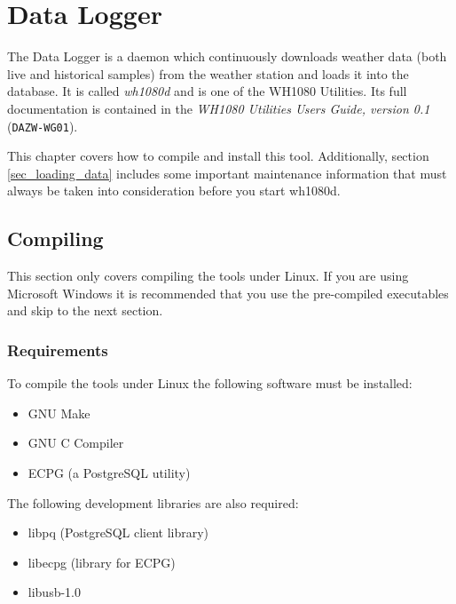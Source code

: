 \documentclass[a4paper,10pt,draft]{book}
\begin{document}

\chapter{Data Logger}
\label{cha_data_logger}

The Data Logger is a daemon which continuously downloads weather data (both live and historical samples) from the weather station and loads it into the database. It is called \emph{wh1080d} and is one of the WH1080 Utilities. Its full documentation is contained in the \emph{WH1080 Utilities Users Guide, version 0.1} (\verb|DAZW-WG01|).

This chapter covers how to compile and install this tool. Additionally, section \ref{sec_loading_data} includes some important maintenance information that must always be taken into consideration before you start wh1080d.

\section{Compiling}
This section only covers compiling the tools under Linux. If you are using Microsoft Windows it is recommended that you use the pre-compiled executables and skip to the next section.

\subsection{Requirements}
To compile the tools under Linux the following software must be installed:
\begin{itemize}
\item GNU Make
\item GNU C Compiler
\item ECPG (a PostgreSQL utility)
\end{itemize}

The following development libraries are also required:
\begin{itemize}
\item libpq (PostgreSQL client library)
\item libecpg (library for ECPG)
\item libusb-1.0
\end{itemize}
\end{document}
